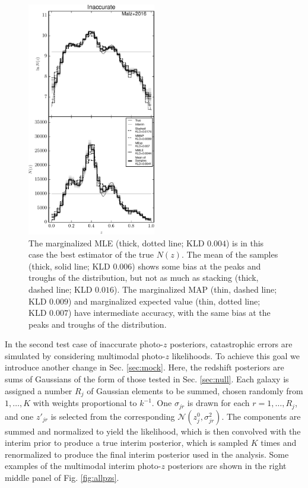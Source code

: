 \documentclass[preprint]{aastex}
\begin{document}
\begin{figure}
\includegraphics[width=0.5\textwidth]{figs/vars/comps.pdf}
\caption{The marginalized MLE (thick, dotted line; KLD $0.004$) is in this case 
the best estimator of the true $N(z)$.  The mean of the samples (thick, solid 
line; KLD $0.006$) shows some bias at the peaks and troughs of the 
distribution, but not as much as stacking (thick, dashed line; KLD $0.016$).  
The marginalized MAP (thin, dashed line; KLD $0.009$) and marginalized expected 
value (thin, dotted line; KLD $0.007$) have intermediate accuracy, with the 
same bias at the peaks and troughs of the distribution.}
\label{fig:noisy-comp}
\end{figure}

In the second test case of inaccurate photo-$z$ posteriors, catastrophic errors 
are simulated by considering multimodal photo-$z$ likelihoods.  To achieve this 
goal we introduce another change in Sec. \ref{sec:mock}.  Here, the redshift 
posteriors are sums of Gaussians of the form of those tested in Sec. 
\ref{sec:null}.  Each galaxy is assigned a number $R_{j}$ of Gaussian elements 
to be summed, chosen randomly from $1,\dots,K$ with weights proportional to 
$k^{-1}$.  One $\sigma_{jr}$ is drawn for each $r=1,\dots,R_{j}$, and one 
$z'_{jr}$ is selected from the corresponding 
$\mathcal{N}(z^{0}_{j},\sigma^{2}_{jr})$.  The components are summed and 
normalized to yield the likelihood, which is then convolved with the interim 
prior to produce a true interim posterior, which is sampled $K$ times and 
renormalized to produce the final interim posterior used in the analysis.  Some 
examples of the multimodal interim photo-$z$ posteriors are shown in the right 
middle panel of Fig. \ref{fig:allpzs}.  
\end{document}
